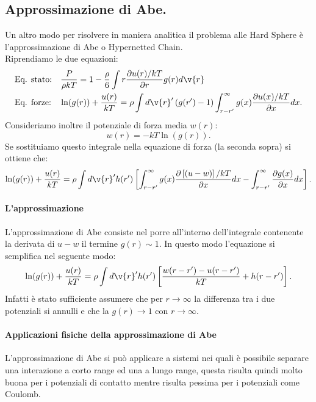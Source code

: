 \subsection{Approssimazione di Abe.}
Un altro modo per risolvere in maniera analitica il problema alle Hard Sphere è l'approssimazione di Abe o Hypernetted Chain. \\
Riprendiamo le due equazioni:
\[\begin{aligned}
	&\text{Eq. stato:} \quad\frac{P}{\rho kT} 
	=
	1-\frac{\rho }{6}\int r \frac{\partial u(r)/kT}{\partial r} g(r) d \v{r}\\
	&\text{Eq. forze:}\quad\ln(g(r))+\frac{u(r)}{kT}
	=
	\rho \int d \v{r}'\left( g(r')-1 \right) 
	\int_{r-r'}^{\infty} g(x)\frac{\partial u(x)/kT}{\partial x} dx
.\end{aligned}\]
Consideriamo inoltre il potenziale di forza media $w(r)$:
\[
	w(r)=-kT\ln(g(r))
.\] 
Se sostituiamo questo integrale nella equazione di forza (la seconda sopra) si ottiene che:
\[
	\ln(g(r)) + \frac{u(r)}{kT} 
	=
	\rho \int d \v{r}'h(r')
	\left[\int_{r-r'}^{\infty} g(x)
	\frac{\partial \left[ \left( u-w \right) \right] /kT}{\partial x}dx 
	-
	\int_{r-r'}^{\infty} \frac{\partial g(x)}{\partial x} dx 
	\right] 
.\]
\paragraph{L'approssimazione}
L'approssimazione di Abe consiste nel porre all'interno dell'integrale contenente la derivata di $u-w$ il termine $g(r)\sim 1$. In questo modo l'equazione si semplifica nel seguente modo:
\[
	\ln(g(r)) + \frac{u(r)}{kT} 
	=
	\rho \int d\v{r}'h(r')\left[ \frac{w(r-r')-u(r-r')}{kT} + h(r-r') \right] 
.\] 
Infatti è stato sufficiente assumere che per $r\to \infty$ la differenza tra i due potenziali si annulli e che la $g(r)\to 1$ con $r\to \infty$.
\paragraph{Applicazioni fisiche della approssimazione di Abe}
L'approssimazione di Abe si può applicare a sistemi nei quali è possibile separare una interazione a corto range ed una a lungo range, questa risulta quindi molto buona per i potenziali di contatto mentre risulta pessima per i potenziali come Coulomb.
